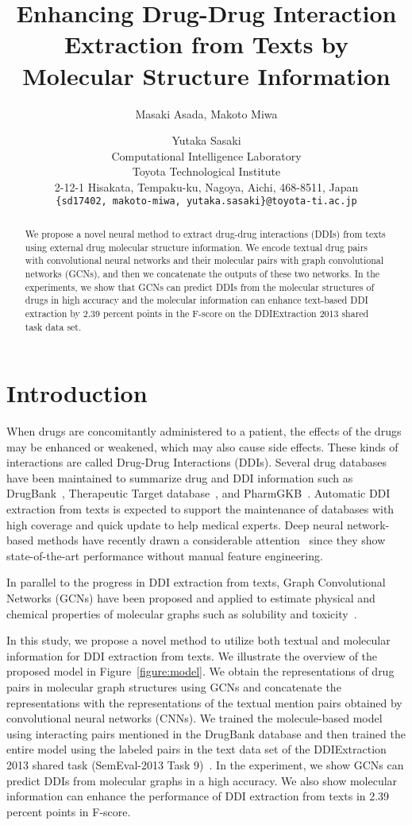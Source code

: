 \documentclass[11pt,a4paper]{article}
\title{Enhancing Drug-Drug Interaction Extraction from Texts by \\Molecular Structure Information}
\author{Masaki Asada{\rm{,}} Makoto Miwa \and Yutaka Sasaki \\
  Computational Intelligence Laboratory \\
  Toyota Technological Institute \\
  2-12-1 Hisakata, Tempaku-ku, Nagoya, Aichi, 468-8511, Japan \\
  {\tt \{sd17402, makoto-miwa, yutaka.sasaki\}@toyota-ti.ac.jp} \\}
\date{}
\begin{document}
\maketitle
\begin{abstract}
We propose a novel neural method to extract drug-drug interactions (DDIs) from texts using external drug molecular structure information. We encode textual drug pairs with convolutional neural networks and their molecular pairs with graph convolutional networks (GCNs), and then we concatenate the outputs of these two networks. In the experiments, we show that GCNs can predict DDIs from the molecular structures of drugs in high accuracy and the molecular information can enhance text-based DDI extraction by 2.39 percent points in the F-score on the DDIExtraction 2013 shared task data set. 
\end{abstract}

\section{Introduction}

When drugs are concomitantly administered to a patient, the effects of the drugs may be enhanced or weakened, which may also cause side effects. These kinds of interactions are called Drug-Drug Interactions (DDIs). Several drug databases have been maintained to summarize drug and DDI information such as DrugBank~\cite{drugbank}, Therapeutic Target database~\cite{yang2016therapeutic}, 
and PharmGKB~\cite{thorn2013pharmgkb}. 
Automatic DDI extraction from texts is expected to support the maintenance of databases with high coverage and quick update to help medical experts. Deep neural network-based methods have recently drawn a considerable attention~\cite{liu2016drug,sahu2017drug,Zheng2017,lim2018drug} since they show state-of-the-art performance without manual feature engineering. 

In parallel to the progress in DDI extraction from texts, Graph Convolutional Networks (GCNs) have been proposed and applied to estimate physical and chemical properties of molecular graphs such as solubility and toxicity~\cite{NIPS2015_5954,li2015gated,gilmer2017neural}. 

In this study, we propose a novel method to utilize both textual and molecular information for DDI extraction from texts. We illustrate the overview of the proposed model in Figure~\ref{figure:model}. 
We obtain the representations of drug pairs in molecular graph structures using GCNs and concatenate the representations with the representations of the textual mention pairs obtained by convolutional neural networks (CNNs). 
We trained the molecule-based model using interacting pairs mentioned in the DrugBank database and then trained the entire model using the labeled pairs in the text data set of the DDIExtraction 2013 shared task (SemEval-2013 Task 9)~\cite{segura2013semeval}.   
In the experiment, we show GCNs can predict DDIs from molecular graphs in a high accuracy. 
We also show molecular information can enhance the performance of DDI extraction from texts in 2.39 percent points in F-score. 
\end{document}
